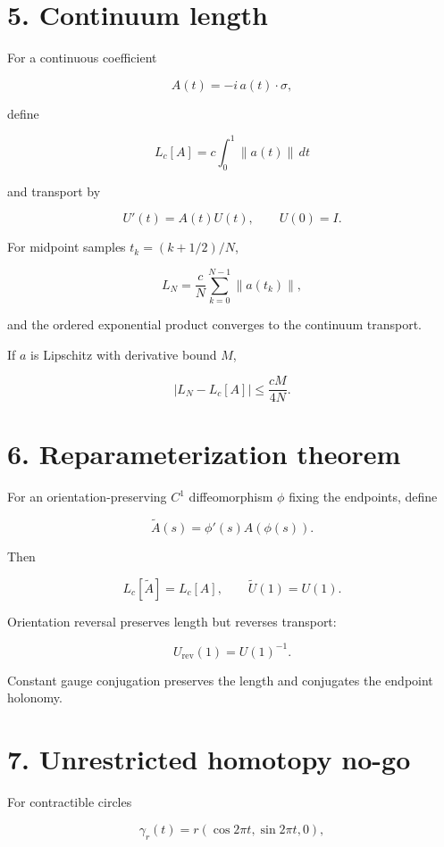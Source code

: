 \hypertarget{continuum-length}{%
\section{5. Continuum length}\label{continuum-length}}

For a continuous coefficient

\[
A(t)=-i\,a(t)\cdot\sigma,
\]

define

\[
L_c[A]=c\int_0^1\|a(t)\|\,dt
\]

and transport by

\[
U'(t)=A(t)U(t),
\qquad U(0)=I.
\]

For midpoint samples \(t_k=(k+1/2)/N\),

\[
L_N=\frac cN\sum_{k=0}^{N-1}\|a(t_k)\|,
\]

and the ordered exponential product converges to the continuum transport.

If \(a\) is Lipschitz with derivative bound \(M\),

\[
\boxed{|L_N-L_c[A]|\le \frac{cM}{4N}.}
\]

\hypertarget{reparameterization-theorem}{%
\section{6. Reparameterization theorem}\label{reparameterization-theorem}}

For an orientation-preserving \(C^1\) diffeomorphism \(\phi\) fixing the endpoints, define

\[
\widetilde A(s)=\phi'(s)A(\phi(s)).
\]

Then

\[
\boxed{L_c[\widetilde A]=L_c[A],
\qquad
\widetilde U(1)=U(1).}
\]

Orientation reversal preserves length but reverses transport:

\[
U_{\mathrm{rev}}(1)=U(1)^{-1}.
\]

Constant gauge conjugation preserves the length and conjugates the endpoint holonomy.

\hypertarget{unrestricted-homotopy-no-go}{%
\section{7. Unrestricted homotopy no-go}\label{unrestricted-homotopy-no-go}}

For contractible circles

\[
\gamma_r(t)=r(\cos 2\pi t,\sin 2\pi t,0),
\]


